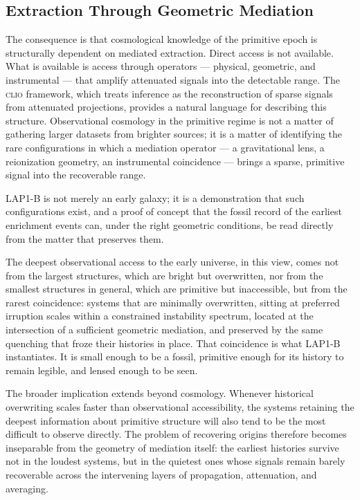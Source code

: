\documentclass[12pt, a4paper]{article}
\newcommand{\CLIO}{\textsc{clio}}
\theoremstyle{definition}
\begin{document}
\subsection{Extraction Through Geometric Mediation}

The consequence is that cosmological knowledge of the primitive epoch is
structurally dependent on mediated extraction. Direct access is not available.
What is available is access through operators --- physical, geometric, and
instrumental --- that amplify attenuated signals into the detectable range.
The \CLIO{} framework, which treats inference as the reconstruction of sparse
signals from attenuated projections, provides a natural language for
describing this structure. Observational cosmology in the primitive regime
is not a matter of gathering larger datasets from brighter sources; it is a
matter of identifying the rare configurations in which a mediation operator
--- a gravitational lens, a reionization geometry, an instrumental coincidence
--- brings a sparse, primitive signal into the recoverable range.

LAP1-B is not merely an early galaxy; it is a demonstration that such
configurations exist, and a proof of concept that the fossil record of the
earliest enrichment events can, under the right geometric conditions, be read
directly from the matter that preserves them.

The deepest observational access to the early universe, in this view, comes
not from the largest structures, which are bright but overwritten, nor from
the smallest structures in general, which are primitive but inaccessible,
but from the rarest coincidence: systems that are minimally overwritten,
sitting at preferred irruption scales within a constrained instability
spectrum, located at the intersection of a sufficient geometric mediation,
and preserved by the same quenching that froze their histories in place.
That coincidence is what LAP1-B instantiates. It is small enough to be a
fossil, primitive enough for its history to remain legible, and lensed
enough to be seen.

The broader implication extends beyond cosmology. Whenever historical
overwriting scales faster than observational accessibility, the systems
retaining the deepest information about primitive structure will also tend
to be the most difficult to observe directly. The problem of recovering
origins therefore becomes inseparable from the geometry of mediation itself:
the earliest histories survive not in the loudest systems, but in the
quietest ones whose signals remain barely recoverable across the intervening
layers of propagation, attenuation, and averaging.
\end{document}
